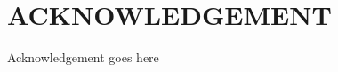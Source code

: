 \documentclass[conference]{IEEEtran}
\begin{document}

\section*{ACKNOWLEDGEMENT}
Acknowledgement goes here

\end{document}

